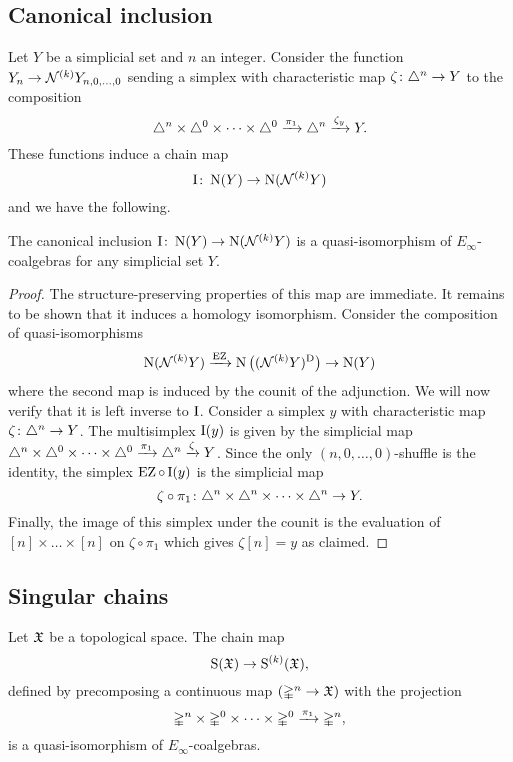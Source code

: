 \subsection{Canonical inclusion}\label{ss:inclusion}

Let $Y$ be a simplicial set and $n$ an integer.
Consider the function $Y_n \to \mathcal{N}^{(k)} Y_{n,0,\dots,0}$ sending a simplex with characteristic map $\zeta \colon \triangle^n \to Y$ to the composition
\[
\triangle^n \times \triangle^{0}\times\dots\times\triangle^{0} \xrightarrow{\pi_1} \triangle^n \xrightarrow{\zeta_y} Y.
\]
These functions induce a chain map
\[
\operatorname{I} \colon \operatorname{N}(Y) \to \operatorname{N}(\mathcal{N}^{(k)} Y)
\]
and we have the following.

\begin{theorem}
	The canonical inclusion $\operatorname{I} \colon \operatorname{N}(Y) \to \operatorname{N}(\mathcal{N}^{(k)} Y)$ is a quasi-isomorphism of $E_\infty$-coalgebras for any simplicial set $Y$.
\end{theorem}

\begin{proof}
	The structure-preserving properties of this map are immediate.
	It remains to be shown that it induces a homology isomorphism.
	Consider the composition of quasi-isomorphisms
	\[
	\operatorname{N}(\mathcal{N}^{(k)} Y) \xrightarrow{\operatorname{EZ}}
	\operatorname{N}\big((\mathcal{N}^{(k)} Y)^{\mathrm{D}}\big) \to
	\operatorname{N}(Y)
	\]
	where the second map is induced by the counit of the adjunction.
	We will now verify that it is left inverse to $\operatorname{I}$.
	Consider a simplex $y$ with characteristic map $\zeta \colon \triangle^n \to Y$.
	The multisimplex $\operatorname{I}(y)$ is given by the simplicial map $\triangle^n \times \triangle^{0}\times\dots\times\triangle^{0} \xrightarrow{\pi_1} \triangle^n \xrightarrow{\zeta} Y$.
	Since the only $(n,0,\dots,0)$-shuffle is the identity, the simplex $\operatorname{EZ} \circ \operatorname{I} (y)$ is the simplicial map
	\[
	\zeta \circ \pi_1 \colon \triangle^n \times \triangle^{n}\times\dots\times\triangle^{n} \to Y.
	\]
	Finally, the image of this simplex under the counit is the evaluation of $[n] \times\dots\times [n]$ on $\zeta \circ \pi_1$ which gives $\zeta[n] = y$ as claimed.
\end{proof}

\subsection{Singular chains}\label{ss:singular}

\begin{theorem}
	Let $\mathfrak{X}$ be a topological space.
	The chain map
	\[
	\mathrm{S}(\mathfrak{X}) \to \mathrm{S}^{(k)}(\mathfrak{X}),
	\]
	defined by precomposing a continuous map $(\mathbb{\Delta}^n \to \mathfrak{X})$ with the projection
	\[
	\mathbb{\Delta}^n \times \mathbb{\Delta}^{0}\times\dots\times\mathbb{\Delta}^{0} \xrightarrow{\pi_1} \mathbb{\Delta}^n,
	\]
	is a quasi-isomorphism of $E_\infty$-coalgebras.
\end{theorem}

